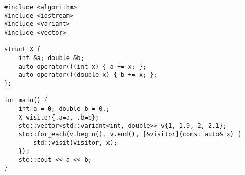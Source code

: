 \begin{lstlisting}[title=\href{https://godbolt.org/z/r3a1q4}{\texttt{godbolt.org/z/r3a1q4}}]
#include <algorithm>
#include <iostream>
#include <variant>
#include <vector>

struct X {
    int &a; double &b;
    auto operator()(int x) { a += x; };
    auto operator()(double x) { b += x; };
};

int main() {
    int a = 0; double b = 0.;
    X visitor{.a=a, .b=b};
    std::vector<std::variant<int, double>> v{1, 1.9, 2, 2.1};
    std::for_each(v.begin(), v.end(), [&visitor](const auto& x) {
        std::visit(visitor, x);
    });
    std::cout << a << b;
}
\end{lstlisting}
